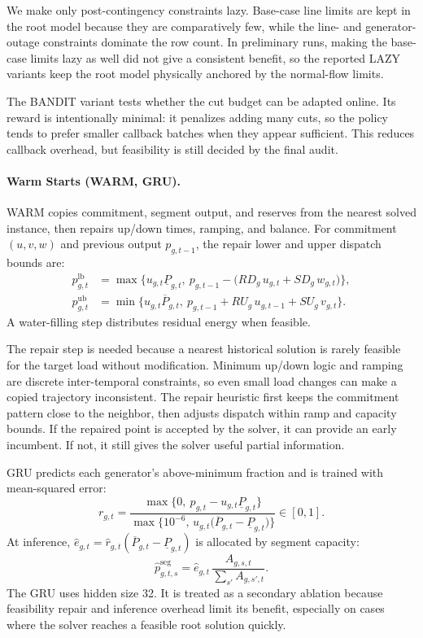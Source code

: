 \documentclass[runningheads]{llncs}
\begin{document}
We make only post-contingency constraints lazy. Base-case line limits are kept in the root model because they are comparatively few, while the line- and generator-outage constraints dominate the row count. In preliminary runs, making the base-case limits lazy as well did not give a consistent benefit, so the reported LAZY variants keep the root model physically anchored by the normal-flow limits.

The BANDIT variant tests whether the cut budget can be adapted online. Its reward is intentionally minimal: it penalizes adding many cuts, so the policy tends to prefer smaller callback batches when they appear sufficient. This reduces callback overhead, but feasibility is still decided by the final audit.


\paragraph{Warm Starts (WARM, GRU).}
WARM copies commitment, segment output, and reserves from the nearest solved instance, then repairs up/down times, ramping, and balance. For commitment $(u,v,w)$ and previous output $p_{g,t-1}$, the repair lower and upper dispatch bounds are:
\begin{align}
p^{\mathrm{lb}}_{g,t}&=\max\!\Big\{u_{g,t}\underline{P}_{g,t},\ p_{g,t-1}-\big(RD_g\,u_{g,t}+SD_g\,w_{g,t}\big)\Big\}, \\
p^{\mathrm{ub}}_{g,t}&=\min\!\Big\{u_{g,t}\overline{P}_{g,t},\ p_{g,t-1}+RU_g\,u_{g,t-1}+SU_g\,v_{g,t}\Big\}.
\end{align}
A water-filling step distributes residual energy when feasible.

The repair step is needed because a nearest historical solution is rarely feasible for the target load without modification. Minimum up/down logic and ramping are discrete inter-temporal constraints, so even small load changes can make a copied trajectory inconsistent. The repair heuristic first keeps the commitment pattern close to the neighbor, then adjusts dispatch within ramp and capacity bounds. If the repaired point is accepted by the solver, it can provide an early incumbent. If not, it still gives the solver useful partial information.

GRU predicts each generator's above-minimum fraction and is trained with mean-squared error:
\begin{equation}
r_{g,t}=\frac{\max\{0,\ p_{g,t}-u_{g,t}\underline{P}_{g,t}\}}{\max\{10^{-6},\,u_{g,t}\big(\overline{P}_{g,t}-\underline{P}_{g,t}\big)\}}\in[0,1].
\end{equation}
At inference, $\hat e_{g,t}=\hat r_{g,t}(\overline{P}_{g,t}-\underline{P}_{g,t})$ is allocated by segment capacity:
\begin{equation}
\hat p^{\mathrm{seg}}_{g,t,s}=\hat e_{g,t}\,\frac{A_{g,s,t}}{\sum_{s'}A_{g,s',t}}.
\end{equation}
The GRU uses hidden size 32. It is treated as a secondary ablation because feasibility repair and inference overhead limit its benefit, especially on cases where the solver reaches a feasible root solution quickly.
\end{document}
